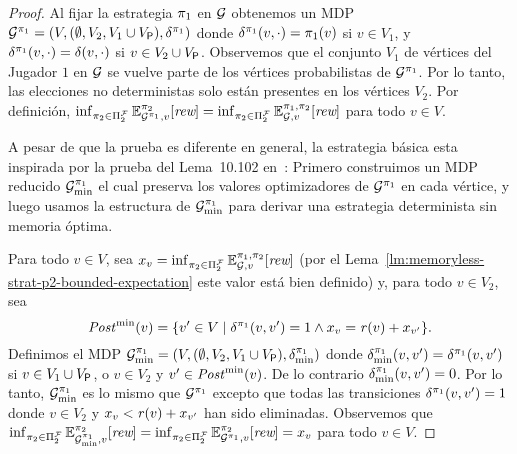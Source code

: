 \fi
\begin{proof}
  Al fijar la estrategia $\pi_{1}$ en $\mathcal{G}$ obtenemos un MDP
  $\mathcal{G}^{\pi_{1}} = (V, (\emptyset,V_2,V_1\cup V_{\mathsf{P}}),\delta^{\pi_{1}})$
  donde $\delta^{\pi_{1}}(v,\cdot)=\pi_{1}(v)$ si $v\in V_1$, y
  $\delta^{\pi_{1}}(v,\cdot)=\delta(v,\cdot)$ si $v\in V_2\cup V_{\mathsf{P}}$.
  Observemos que el conjunto $V_1$ de vértices del Jugador $1$ en $\mathcal{G}$ se vuelve
  parte de los vértices probabilistas de $\mathcal{G}^{\pi_{1}}$.  Por lo tanto,
  las elecciones no deterministas solo están presentes en los vértices  $V_2$.
  Por definición,
  $\inf_{\pi_{2} \in \Pi^{\mathcal{F}}_{2}} \mathbb{E}^{\pi_{2}}_{\mathcal{G}^{\pi_{1}},v}[\textit{rew}] =
  \inf_{\pi_{2} \in \Pi^{\mathcal{F}}_{2}} \mathbb{E}^{\pi_{1}, \pi_{2}}_{\mathcal{G},v}[\textit{rew}]$
  para todo $v\in V$.

  A pesar de que la prueba es diferente en general, la estrategia básica esta inspirada por la prueba del Lema~10.102 en~\cite{BaierK08}: Primero construimos
  un MDP reducido $\mathcal{G}^{\pi_{1}}_{\min}$ el cual preserva los valores optimizadores de $\mathcal{G}^{\pi_{1}}$ en cada vértice, y luego usamos la estructura de $\mathcal{G}^{\pi_{1}}_{\min}$ para derivar una estrategia determinista sin memoria óptima.

  Para todo $v\in V$,
  sea $x_v = \inf_{\pi_{2} \in \Pi^{\mathcal{F}}_{2}} \mathbb{E}^{\pi_{1}, \pi_{2}}_{\mathcal{G},v}[\textit{rew}]$
  (por el Lema~\ref{lm:memoryless-strat-p2-bounded-expectation} este valor está bien definido) y,
  para todo $v\in V_2$, sea
  \begin{equation}\label{lm:infima-in-dmf-def-postmin}
 	\mathit{Post}^{\min}(v) = \{{v'\in V} \mid {\delta^{\pi_{1}}(v,v')=1} \land {x_v=\mathit{r}(v)+x_{v'}}\}.
  \end{equation}
  Definimos el MDP
  $\mathcal{G}^{\pi_{1}}_{\min} = (V, (\emptyset,V_2,V_1\cup V_{\mathsf{P}}),\delta^{\pi_{1}}_{\min})$
  donde $\delta^{\pi_{1}}_{\min}(v,v')=\delta^{\pi_{1}}(v,v')$ si $v\in V_1\cup
  V_{\mathsf{P}}$, o $v\in V_2$ y $v'\in\mathit{Post}^{\min}(v)$. De lo contrario
  $\delta^{\pi_{1}}_{\min}(v,v')=0$.
  Por lo tanto, $\mathcal{G}^{\pi_{1}}_{\min}$ es lo mismo que $\mathcal{G}^{\pi_{1}}$ excepto que todas las transiciones $\delta^{\pi_{1}}(v,v')=1$ donde $v\in V_2$ y
  $x_v < \mathit{r}(v)+x_{v'}$ han sido eliminadas.
  Observemos que
  $\inf_{\pi_{2} \in \Pi^{\mathcal{F}}_{2}} \mathbb{E}^{\pi_{2}}_{\mathcal{G}^{\pi_{1}}_{\min},v}[\textit{rew}] =
  \inf_{\pi_{2} \in \Pi^{\mathcal{F}}_{2}} \mathbb{E}^{\pi_{2}}_{\mathcal{G}^{\pi_{1}},v}[\textit{rew}] =
  x_v$
  para todo $v\in V$.


\end{proof}
